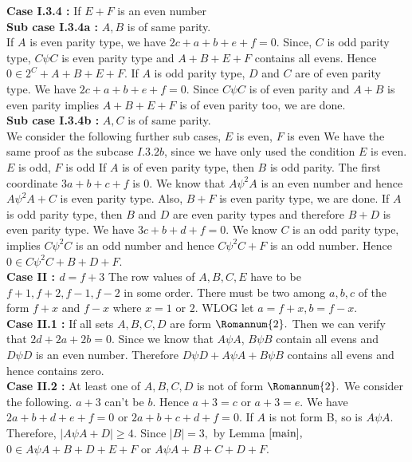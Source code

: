 \documentclass[reqno,10pt]{amsart}
\newcommand{\two}{\Romannum {2}}
\begin{document}
\textbf{Case I.3.4 :} If $E+F$ is an even number\\
\textbf{Sub case I.3.4a :} $A,B$ is of same parity.\\
If $A$ is  even parity type, we have $2c+a+b+e+f=0.$ Since, $C$ is odd parity type, $C\psi C$ is even parity type and $A+B+E+F$ contains all evens. Hence $ 0 \in 2^C+A+B+E+F$. If $A$ is odd parity type, $D$ and $C$ are of even parity type. We have $2c+a+b+e+f=0.$ Since $C \psi C$ is of even parity and $A+B$ is even parity implies $A+B+E+F$ is of even parity too, we are done.\\
\textbf{Sub case I.3.4b :} $A,C$ is of same parity.\\
We consider the following further sub cases,
$E$ is even, $F$ is even 
We have the same proof as the subcase $I.3.2b$, since we have only used the condition $E$ is even.\\
$E$ is odd, $F$ is odd
If $A$ is of even parity type, then $B$ is odd parity. The first coordinate $3a+b+c+f$ is $0.$ We know that $A\psi^2 A$ is an even number and hence $A\psi^2 A+C$ is even parity type. Also, $B+F$ is even parity type, we are done.
If $A$ is odd parity type, then $B$ and $D$ are even parity types and therefore $B+D$ is even parity type. We have $3c+b+d+f = 0.$ 
 We know $C$ is an odd parity type, implies $C \psi^2 C $ is an odd number and hence $C \psi^2 C +F$ is an odd number. Hence $ 0 \in C \psi^2 C + B+D+F.$ \\
\textbf{Case II : $d = f+3$}
The row values of $A,B,C,E$ have to be $f+1,f+2,f-1,f-2$ in some order. There must be two among $a,b,c$ of the form $f+x$ and $f-x$ where $x = 1$ or $2.$  WLOG let $a=f+x, b=f-x$. \\
\textbf{Case II.1 :} If all sets $A,B,C,D$ are form $\two.$ Then we can verify that $2d+2a+2b = 0.$ Since we know that $A \psi A$, $ B \psi B$ contain all evens and $D \psi D$ is an even number. Therefore $D \psi D + A \psi A + B \psi B$ contains all evens and hence contains zero.\\
\textbf{Case II.2 :}  At least one of $A,B,C,D$ is not of form $\two.$
 We consider the following. $a+3$ can't be $b$. Hence $a+3=c$ or $a+3=e.$  We have $2a+b+d+e+f=0$ or $2a+b+c+d+f=0.$
 If $A$ is not form B, so is $A\psi A$. Therefore, $|A\psi A+D|\geq4.$ Since $|B|=3,$ by Lemma $\ref{main},$  $ 0 \in A\psi A+B+D+E+F$ or $A\psi A+B+C+D+F.$
 
\end{document}
